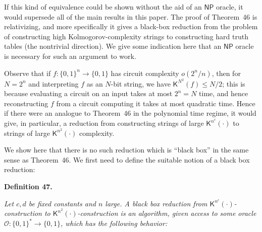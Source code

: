 \documentclass[10pt,a4paper]{article}
\begin{document}



If this kind of equivalence could be shown without the aid of an ${\mathsf{NP}}$ oracle, it would supersede all of the main results in this paper. The proof of Theorem 46 is relativizing, and more specifically it gives a black-box reduction from the problem of constructing high Kolmogorov-complexity strings to constructing hard truth tables (the nontrivial direction). We give some indication here that an ${\mathsf{NP}}$ oracle is necessary for such an argument to work.\par




Observe that if $f:\{0,1\}^{n}\to\{0,1\}$ has circuit complexity $o(2^{n}/n)$, then for $N=2^{n}$ and interpreting $f$ as an $N$-bit string, we have ${\mathsf{K}}^{N^{2}}(f)\leq N/2$; this is because evaluating a circuit on an input takes at most $2^{n}=N$ time, and hence reconstructing $f$ from a circuit computing it takes at most quadratic time. Hence if there were an analogue to Theorem 46 in the polynomial time regime, it would give, in particular, a reduction from constructing strings of large $\mathsf{K}^{n^{c}}(\cdot)$ to strings of large $\mathsf{K}^{n^{2}}(\cdot)$ complexity.\par




We show here that there is no such reduction which is “black box” in the same sense as Theorem 46. We first need to define the suitable notion of a black box reduction:\par





\par\medskip\noindent\textbf{
\textbf{Definition 47}\textbf{.}
}\par



\emph{Let $c,d$ be fixed constants and $n$ large. A black box reduction from $\mathsf{K}^{n^{c}}(\cdot)$-construction to $\mathsf{K}^{n^{2}}(\cdot)$-construction is an algorithm, given access to some oracle $\mathcal{O}:\{0,1\}^{*}\to\{0,1\}$, which has the following behavior:}\par
\end{document}
